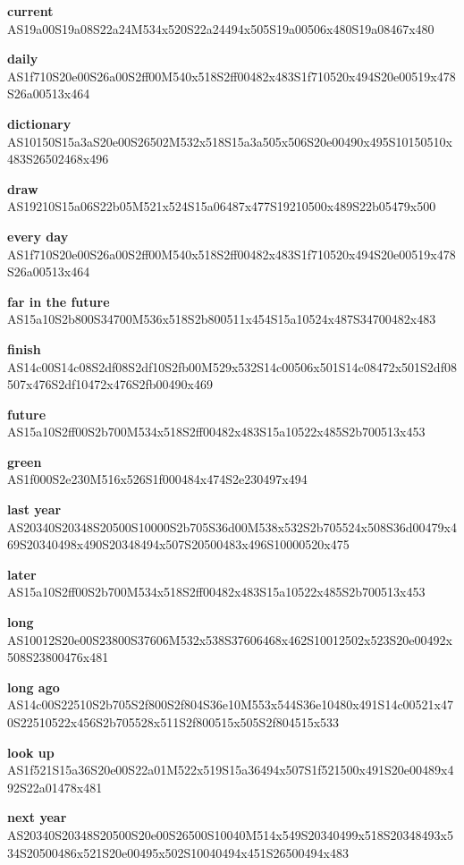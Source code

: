\documentclass{article}
\begin{document}
\begin{glossary}
\textbf{current}\\
AS19a00S19a08S22a24M534x520S22a24494x505S19a00506x480S19a08467x480

\textbf{daily}\\
AS1f710S20e00S26a00S2ff00M540x518S2ff00482x483S1f710520x494S20e00519x478S26a00513x464

\textbf{dictionary}\\
AS10150S15a3aS20e00S26502M532x518S15a3a505x506S20e00490x495S10150510x483S26502468x496

\textbf{draw}\\
AS19210S15a06S22b05M521x524S15a06487x477S19210500x489S22b05479x500

\textbf{every day}\\
AS1f710S20e00S26a00S2ff00M540x518S2ff00482x483S1f710520x494S20e00519x478S26a00513x464

\textbf{far in the future}\\
AS15a10S2b800S34700M536x518S2b800511x454S15a10524x487S34700482x483

\textbf{finish}\\
AS14c00S14c08S2df08S2df10S2fb00M529x532S14c00506x501S14c08472x501S2df08507x476S2df10472x476S2fb00490x469

\textbf{future}\\
AS15a10S2ff00S2b700M534x518S2ff00482x483S15a10522x485S2b700513x453

\textbf{green}\\
AS1f000S2e230M516x526S1f000484x474S2e230497x494

\textbf{last year}\\
AS20340S20348S20500S10000S2b705S36d00M538x532S2b705524x508S36d00479x469S20340498x490S20348494x507S20500483x496S10000520x475

\textbf{later}\\
AS15a10S2ff00S2b700M534x518S2ff00482x483S15a10522x485S2b700513x453

\textbf{long}\\
AS10012S20e00S23800S37606M532x538S37606468x462S10012502x523S20e00492x508S23800476x481

\textbf{long ago}\\
AS14c00S22510S2b705S2f800S2f804S36e10M553x544S36e10480x491S14c00521x470S22510522x456S2b705528x511S2f800515x505S2f804515x533

\textbf{look up}\\
AS1f521S15a36S20e00S22a01M522x519S15a36494x507S1f521500x491S20e00489x492S22a01478x481

\textbf{next year}\\
AS20340S20348S20500S20e00S26500S10040M514x549S20340499x518S20348493x534S20500486x521S20e00495x502S10040494x451S26500494x483


\end{glossary}
\end{document}
